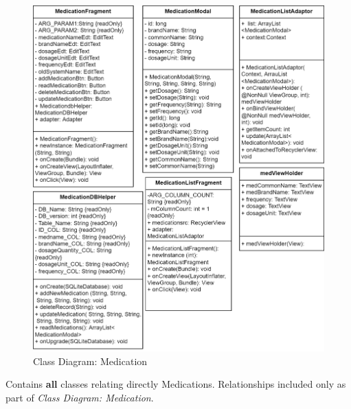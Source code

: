 \documentclass[11pt]{article}
\begin{document}
    \begin{figure}[H]
        \centering
        \includegraphics[width=\textwidth]{Diagrams/Class Diagrams/Class Diagram-Medication Classes}
        \caption{Class Diagram: Medication}
        \label{fig:figure1}
    \end{figure}

    Contains \textbf{all} classes relating directly Medications.
    Relationships included only as part of \textit{Class Diagram: Medication}.
\end{document}
